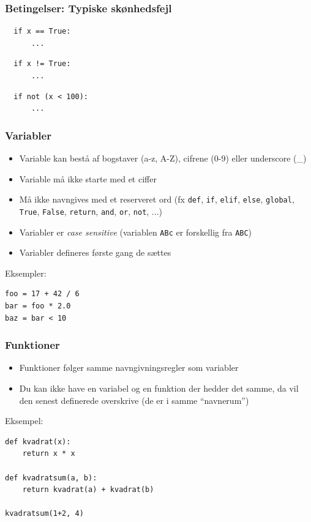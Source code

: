 \documentclass[10pt]{beamer}
\begin{document}
\begin{frame}[fragile]
  \frametitle{Betingelser: Typiske skønhedsfejl}

\begin{verbatim}
  if x == True:
      ...
\end{verbatim}

\vspace{5mm}

\begin{verbatim}
  if x != True:
      ...
\end{verbatim}

\vspace{5mm}

\begin{verbatim}
  if not (x < 100):
      ...
\end{verbatim}

\end{frame}



\begin{frame}[fragile]
  \frametitle{Variabler}

  \begin{itemize}
  \item Variable kan bestå af bogstaver (a-z, A-Z), cifrene (0-9) eller underscore (\_)
  \item Variable må ikke starte med et ciffer
  \item Må ikke navngives med et reserveret ord (fx \texttt{def}, \texttt{if}, \texttt{elif}, \texttt{else}, \texttt{global}, \texttt{True}, \texttt{False}, \texttt{return}, \texttt{and}, \texttt{or}, \texttt{not}, ...)
  \item Variabler er \textit{case sensitive} (variablen \texttt{ABc} er forskellig fra \texttt{ABC})
  \item Variabler defineres første gang de sættes
  \end{itemize}

  \vspace{5mm}
Eksempler:
\begin{verbatim}
foo = 17 + 42 / 6
bar = foo * 2.0
baz = bar < 10
\end{verbatim}

\end{frame}

\begin{frame}
  \frametitle{Funktioner}
  \begin{itemize}
  \item Funktioner følger samme navngivningsregler som variabler
  \item Du kan ikke have en variabel og en funktion der hedder det
    samme, da vil den senest definerede overskrive (de er i samme ``navnerum'')
  \end{itemize}

Eksempel:
\begin{verbatim}
def kvadrat(x):
    return x * x

def kvadratsum(a, b):
    return kvadrat(a) + kvadrat(b)

kvadratsum(1+2, 4)
\end{verbatim}

\end{frame}
\end{document}
